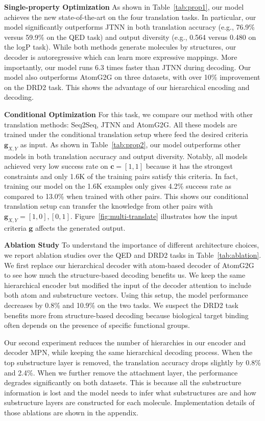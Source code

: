 \documentclass{article} \usepackage{iclr2020_conference,times}
\def\vc{{\bm{c}}}
\def\vg{{\bm{g}}}
\begin{document}
\textbf{Single-property Optimization } As shown in Table~\ref{tab:prop1}, our model achieves the new state-of-the-art on the four translation tasks. In particular, our model significantly outperforms JTNN in both translation accuracy (e.g., 76.9\% versus 59.9\% on the QED task) and output diversity (e.g., 0.564 versus 0.480 on the logP task). While both methods generate molecules by structures, our decoder is autoregressive which can learn more expressive mappings. 
More importantly, our model runs 6.3 times faster than JTNN during decoding. 
Our model also outperforms AtomG2G on three datasets, with over 10\% improvement on the DRD2 task. This shows the advantage of our hierarchical encoding and decoding.

\textbf{Conditional Optimization } For this task, we compare our method with other translation methods: Seq2Seq, JTNN and AtomG2G. All these models are trained under the conditional translation setup where feed the desired criteria $\vg_{X,Y}$ as input.
As shown in Table~\ref{tab:prop2}, our model outperforms other models in both translation accuracy and output diversity. Notably, all models achieved very low success rate on $\vc=[1,1]$ because it has the strongest constraints and only 1.6K of the training pairs satisfy this criteria. In fact, training our model on the 1.6K examples only gives 4.2\% success rate as compared to 13.0\% when trained with other pairs. This shows our conditional translation setup can transfer the knowledge from other pairs with $\vg_{X,Y}=[1,0],[0,1]$.
Figure~\ref{fig:multi-translate} illustrates how the input criteria $\vg$ affects the generated output.

\textbf{Ablation Study } To understand the importance of different architecture choices, we report ablation studies over the QED and DRD2 tasks in Table~\ref{tab:ablation}. We first replace our hierarchical decoder with atom-based decoder of AtomG2G to see how much the structure-based decoding benefits us. We keep the same hierarchical encoder but modified the input of the decoder attention to include both atom and substructure vectors. Using this setup, the model performance decreases by 0.8\% and 10.9\% on the two tasks. We suspect the DRD2 task benefits more from structure-based decoding because biological target binding often depends on the presence of specific functional groups.

Our second experiment reduces the number of hierarchies in our encoder and decoder MPN, while keeping the same hierarchical decoding process. When the top substructure layer is removed, the translation accuracy drops slightly by 0.8\% and 2.4\%. When we further remove the attachment layer, the performance degrades significantly on both datasets. This is because all the substructure information is lost and the model needs to infer what substructures are and how substructure layers are constructed for each molecule.
Implementation details of those ablations are shown in the appendix.
\end{document}
